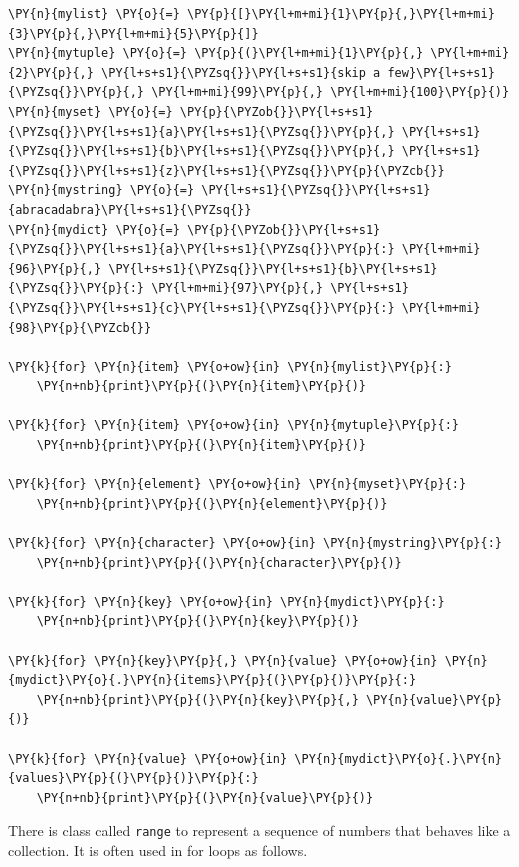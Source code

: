 \begin{Verbatim}[commandchars=\\\{\}]
\PY{n}{mylist} \PY{o}{=} \PY{p}{[}\PY{l+m+mi}{1}\PY{p}{,}\PY{l+m+mi}{3}\PY{p}{,}\PY{l+m+mi}{5}\PY{p}{]}
\PY{n}{mytuple} \PY{o}{=} \PY{p}{(}\PY{l+m+mi}{1}\PY{p}{,} \PY{l+m+mi}{2}\PY{p}{,} \PY{l+s+s1}{\PYZsq{}}\PY{l+s+s1}{skip a few}\PY{l+s+s1}{\PYZsq{}}\PY{p}{,} \PY{l+m+mi}{99}\PY{p}{,} \PY{l+m+mi}{100}\PY{p}{)}
\PY{n}{myset} \PY{o}{=} \PY{p}{\PYZob{}}\PY{l+s+s1}{\PYZsq{}}\PY{l+s+s1}{a}\PY{l+s+s1}{\PYZsq{}}\PY{p}{,} \PY{l+s+s1}{\PYZsq{}}\PY{l+s+s1}{b}\PY{l+s+s1}{\PYZsq{}}\PY{p}{,} \PY{l+s+s1}{\PYZsq{}}\PY{l+s+s1}{z}\PY{l+s+s1}{\PYZsq{}}\PY{p}{\PYZcb{}}
\PY{n}{mystring} \PY{o}{=} \PY{l+s+s1}{\PYZsq{}}\PY{l+s+s1}{abracadabra}\PY{l+s+s1}{\PYZsq{}}
\PY{n}{mydict} \PY{o}{=} \PY{p}{\PYZob{}}\PY{l+s+s1}{\PYZsq{}}\PY{l+s+s1}{a}\PY{l+s+s1}{\PYZsq{}}\PY{p}{:} \PY{l+m+mi}{96}\PY{p}{,} \PY{l+s+s1}{\PYZsq{}}\PY{l+s+s1}{b}\PY{l+s+s1}{\PYZsq{}}\PY{p}{:} \PY{l+m+mi}{97}\PY{p}{,} \PY{l+s+s1}{\PYZsq{}}\PY{l+s+s1}{c}\PY{l+s+s1}{\PYZsq{}}\PY{p}{:} \PY{l+m+mi}{98}\PY{p}{\PYZcb{}}

\PY{k}{for} \PY{n}{item} \PY{o+ow}{in} \PY{n}{mylist}\PY{p}{:}
    \PY{n+nb}{print}\PY{p}{(}\PY{n}{item}\PY{p}{)}

\PY{k}{for} \PY{n}{item} \PY{o+ow}{in} \PY{n}{mytuple}\PY{p}{:}
    \PY{n+nb}{print}\PY{p}{(}\PY{n}{item}\PY{p}{)}

\PY{k}{for} \PY{n}{element} \PY{o+ow}{in} \PY{n}{myset}\PY{p}{:}
    \PY{n+nb}{print}\PY{p}{(}\PY{n}{element}\PY{p}{)}

\PY{k}{for} \PY{n}{character} \PY{o+ow}{in} \PY{n}{mystring}\PY{p}{:}
    \PY{n+nb}{print}\PY{p}{(}\PY{n}{character}\PY{p}{)}

\PY{k}{for} \PY{n}{key} \PY{o+ow}{in} \PY{n}{mydict}\PY{p}{:}
    \PY{n+nb}{print}\PY{p}{(}\PY{n}{key}\PY{p}{)}

\PY{k}{for} \PY{n}{key}\PY{p}{,} \PY{n}{value} \PY{o+ow}{in} \PY{n}{mydict}\PY{o}{.}\PY{n}{items}\PY{p}{(}\PY{p}{)}\PY{p}{:}
    \PY{n+nb}{print}\PY{p}{(}\PY{n}{key}\PY{p}{,} \PY{n}{value}\PY{p}{)}

\PY{k}{for} \PY{n}{value} \PY{o+ow}{in} \PY{n}{mydict}\PY{o}{.}\PY{n}{values}\PY{p}{(}\PY{p}{)}\PY{p}{:}
    \PY{n+nb}{print}\PY{p}{(}\PY{n}{value}\PY{p}{)}
\end{Verbatim}



There is class called \texttt{range} to represent a sequence of numbers that behaves like a collection.
It is often used in for loops as follows.

